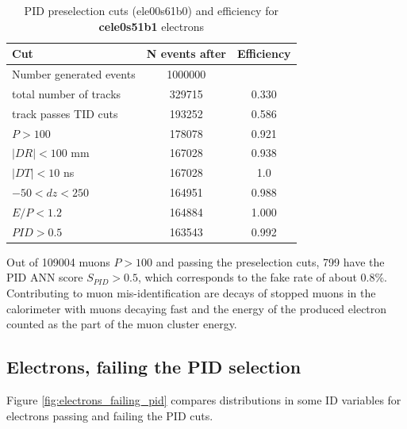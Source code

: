\begin{table}[H]
  \begin{center}
    \begin{tabular}{l|c|c} %
      \textbf{Cut}                    & \textbf{N events after } & \textbf{Efficiency }\\
      \hline
      Number generated events         & 1000000          &            \\
      total number of tracks          &  329715          &   0.330    \\
      \hline
      track passes TID cuts           &  193252          &   0.586    \\
      $P > 100$                       &  178078          &   0.921    \\
      $|DR| < 100$ mm                 &  167028          &   0.938    \\
      $|DT| < 10$ ns                  &  167028          &   1.0      \\
      $-50 < dz < 250$                &  164951          &   0.988    \\
      $ E/P < 1.2$                    &  164884          &   1.000    \\
      \hline
      $PID >0.5$                      &  163543          &   0.992    \\
   \end{tabular}
  \end{center}
  \caption{
    \label{tab:pid_preselection_cuts}
    PID preselection cuts (ele00s61b0) and efficiency for {\bf cele0s51b1} electrons 
  }
\end{table}

Out of 109004 muons $P > 100$ and passing the preselection cuts, 799 have the PID ANN score $S_{PID} > 0.5$,
which corresponds to the fake rate of about 0.8\%. Contributing to muon mis-identification are decays of
stopped muons in the calorimeter with muons decaying fast and the energy of the produced electron counted
as the part of the muon cluster energy. 


\subsection { Electrons, failing the PID selection} 

Figure \ref{fig:electrons_failing_pid} compares distributions in some ID variables for electrons 
passing and failing the PID cuts.

